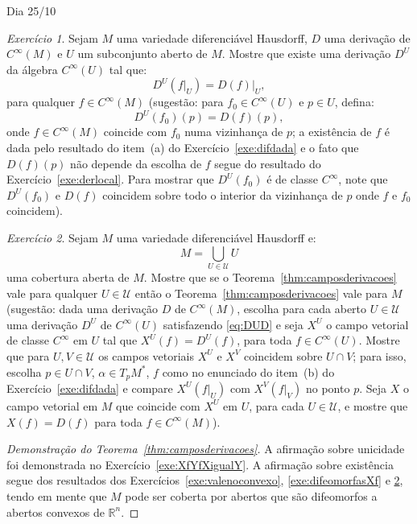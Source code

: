 \documentclass[oneside,11pt]{amsart}
\newcommand{\R}{\mathds R}
\theoremstyle{remark}\newtheorem{exercise}{Exercício}[section]
\theoremstyle{plain}\newtheorem{teo}{Teorema}[section]
\theoremstyle{plain}\newtheorem{lem}[teo]{Lema}
\theoremstyle{plain}\newtheorem{prop}[teo]{Proposição}
\theoremstyle{definition}\newtheorem{defin}[teo]{Definição}
\theoremstyle{remark}\newtheorem{rem}[teo]{Observação}
\theoremstyle{definition}\newtheorem{example}[teo]{Exemplo}
\numberwithin{equation}{section}
\begin{document}
\begin{section}{Dia 25/10}
\begin{exercise}
Sejam $M$ uma variedade diferenciável Hausdorff, $D$ uma derivação de $C^\infty(M)$ e $U$ um subconjunto aberto de $M$. Mostre que existe uma derivação
$D^U$ da álgebra $C^\infty(U)$ tal que:
\begin{equation}\label{eq:DUD}
D^U(f\vert_U)=D(f)\vert_U,
\end{equation}
para qualquer $f\in C^\infty(M)$ (sugestão: para $f_0\in C^\infty(U)$ e $p\in U$, defina:
\[D^U(f_0)(p)=D(f)(p),\]
onde $f\in C^\infty(M)$ coincide com $f_0$ numa vizinhança de $p$; a existência de $f$ é dada pelo resultado do item~(a) do Exercício~\ref{exe:difdada} e o fato
que $D(f)(p)$ não depende da escolha de $f$ segue do resultado do Exercício~\ref{exe:derlocal}. Para mostrar que $D^U(f_0)$ é de classe $C^\infty$,
note que $D^U(f_0)$ e $D(f)$ coincidem sobre todo o interior da vizinhança de $p$ onde $f$ e $f_0$ coincidem).
\end{exercise}

\begin{exercise}\label{exe:teocampderpedacos}
Sejam $M$ uma variedade diferenciável Hausdorff e:
\[M=\bigcup_{U\in\mathcal U}U\]
uma cobertura aberta de $M$. Mostre que se o Teorema~\ref{thm:camposderivacoes}
vale para qualquer $U\in\mathcal U$ então o Teorema~\ref{thm:camposderivacoes} vale para $M$ (sugestão: dada uma derivação $D$ de $C^\infty(M)$,
escolha para cada aberto $U\in\mathcal U$ uma derivação $D^U$ de $C^\infty(U)$ satisfazendo \eqref{eq:DUD} e seja $X^U$ o campo vetorial de classe
$C^\infty$ em $U$ tal que $X^U(f)=D^U(f)$, para toda $f\in C^\infty(U)$. Mostre que para $U,V\in\mathcal U$ os campos vetoriais $X^U$ e $X^V$
coincidem sobre $U\cap V$; para isso, escolha $p\in U\cap V$, $\alpha\in T_pM^*$, $f$ como no enunciado do item~(b) do Exercício~\ref{exe:difdada}
e compare $X^U(f\vert_U)$ com $X^V(f\vert_V)$ no ponto $p$. Seja $X$ o campo vetorial em $M$ que coincide com $X^U$ em $U$, para cada $U\in\mathcal U$,
e mostre que $X(f)=D(f)$ para toda $f\in C^\infty(M)$).
\end{exercise}

\begin{proof}[Demonstração do Teorema~\ref{thm:camposderivacoes}]
A afirmação sobre unicidade foi demonstrada no Exercício~\ref{exe:XfYfXigualY}. A afirmação sobre existência segue dos resultados dos Exercícios~\ref{exe:valenoconvexo},
\ref{exe:difeomorfasXf} e \ref{exe:teocampderpedacos}, tendo em mente que $M$ pode ser coberta por abertos que são difeomorfos a abertos convexos de $\R^n$.
\end{proof}


\end{section}
\end{document}
